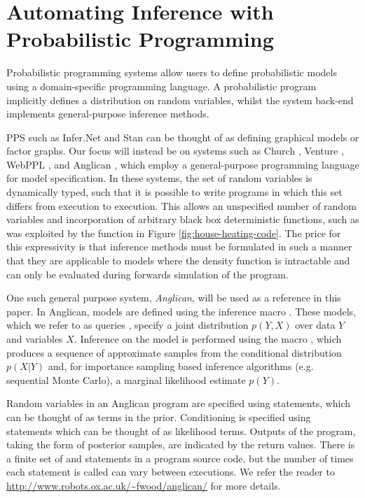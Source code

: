 
\chapter{Automating Inference with Probabilistic Programming}
\label{chp:probprog}

Probabilistic programming systems allow users to define probabilistic models using a domain-specific programming language. A probabilistic program implicitly defines a distribution on random variables, whilst the system back-end implements general-purpose inference methods.  

PPS such as Infer.Net \citep{minka_software_2010} and Stan \citep{carpenter2015stan} can be thought of as defining graphical models or factor graphs.  Our focus will instead be on systems such as Church \citep{goodman_uai_2008}, Venture \citep{mansinghka2014venture}, WebPPL \citep{goodman_book_2014}, and Anglican \citep{wood2014new}, which employ a general-purpose programming language for model specification. In these systems, the set of random variables is dynamically typed, such that it is possible to write programs in which this set differs from execution to execution.  This allows an unspecified number of random variables and incorporation of arbitrary black box deterministic functions, such as was exploited by the \simulatec function in Figure \ref{fig:house-heating-code}. The price for this expressivity is that inference methods must be formulated in such a manner that they are applicable to models where the density function is intractable and can only be evaluated during forwards simulation of the program. 

One such general purpose system, \emph{Anglican}, will be used as a reference in this paper.  In Anglican, models are defined using the inference macro . These models, which we refer to as queries \citep{goodman_uai_2008}, specify a joint distribution $p(Y,X)$ over data $Y$ and variables $X$. Inference on the model is performed using the macro \doquery, which produces a sequence of approximate samples from the conditional distribution $p(X|Y)$ and, for importance sampling based inference algorithms (e.g. sequential Monte Carlo), a marginal likelihood estimate $p(Y)$.  

Random variables in an Anglican program are specified using \sample statements, which can be thought of as terms in the prior. Conditioning is specified using \observe statements which can be thought of as likelihood terms.  Outputs of the program, taking the form of posterior samples, are indicated by the return values.  There is a finite set of \sample and \observe statements in a program source code, but the number of times each statement is called can vary between executions.  We refer the reader to  \href{http://www.robots.ox.ac.uk/~fwood/anglican/}{\small\url{http://www.robots.ox.ac.uk/~fwood/anglican/}} for more details.

